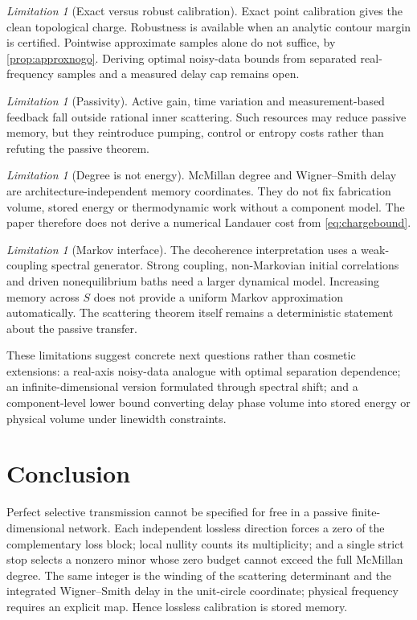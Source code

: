 \documentclass[11pt]{article}
\theoremstyle{definition}
\theoremstyle{remark}
\newtheorem{limitation}[theorem]{Limitation}
\begin{document}
\begin{limitation}[Exact versus robust calibration]
Exact point calibration gives the clean topological charge.  Robustness is
available when an analytic contour margin is certified.  Pointwise
approximate samples alone do not suffice, by \cref{prop:approxnogo}.
Deriving optimal noisy-data bounds from separated real-frequency samples and
a measured delay cap remains open.
\end{limitation}

\begin{limitation}[Passivity]
Active gain, time variation and measurement-based feedback fall outside
rational inner scattering.  Such resources may reduce passive memory, but
they reintroduce pumping, control or entropy costs rather than refuting the
passive theorem.
\end{limitation}

\begin{limitation}[Degree is not energy]
McMillan degree and Wigner--Smith delay are architecture-independent memory
coordinates.  They do not fix fabrication volume, stored energy or
thermodynamic work without a component model.  The paper therefore does not
derive a numerical Landauer cost from \eqref{eq:chargebound}.
\end{limitation}

\begin{limitation}[Markov interface]
The decoherence interpretation uses a weak-coupling spectral generator.
Strong coupling, non-Markovian initial correlations and driven nonequilibrium
baths need a larger dynamical model. Increasing memory across $S$ does not
provide a uniform Markov approximation automatically. The scattering theorem itself remains
a deterministic statement about the passive transfer.
\end{limitation}

These limitations suggest concrete next questions rather than cosmetic
extensions: a real-axis noisy-data analogue with optimal separation
dependence; an infinite-dimensional version formulated through spectral
shift; and a component-level lower bound converting delay phase volume into
stored energy or physical volume under linewidth constraints.

\section{Conclusion}

Perfect selective transmission cannot be specified for free in a passive
finite-dimensional network.  Each independent lossless direction forces a
zero of the complementary loss block; local nullity counts its multiplicity;
and a single strict stop selects a nonzero minor whose zero budget cannot
exceed the full McMillan degree.  The same integer is the winding of the
scattering determinant and the integrated Wigner--Smith delay in the
unit-circle coordinate; physical frequency requires an explicit map. Hence
lossless calibration is stored memory.
\end{document}
